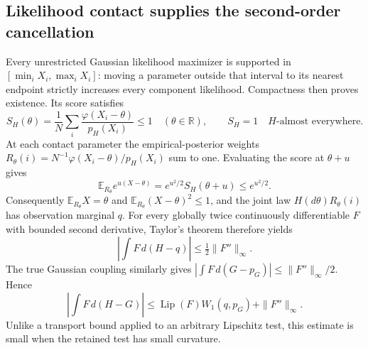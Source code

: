 \documentclass[11pt,a4paper]{article}
\theoremstyle{definition}
\theoremstyle{remark}
\numberwithin{equation}{section}
\begin{document}
\subsection{Likelihood contact supplies the second-order cancellation}

Every unrestricted Gaussian likelihood maximizer is supported in
$[\min_iX_i,\max_iX_i]$: moving a parameter outside that interval
to its nearest endpoint strictly increases every component
likelihood.  Compactness then proves existence.  Its score satisfies
\[
 S_H(\theta)=\frac1N\sum_i
             \frac{\varphi(X_i-\theta)}{p_H(X_i)}\le1
                   \quad(\theta\in\mathbb R),
 \qquad S_H=1\quad H\text{-almost everywhere}.
\]
At each contact parameter the empirical-posterior weights
$R_\theta(i)=N^{-1}\varphi(X_i-\theta)/p_H(X_i)$ sum to one.
Evaluating the score at $\theta+u$ gives
\[
 \mathbb E_{R_\theta}e^{u(X-\theta)}
                  =e^{u^2/2}S_H(\theta+u)\le e^{u^2/2}.
\]
Consequently $\mathbb E_{R_\theta}X=\theta$ and
$\mathbb E_{R_\theta}(X-\theta)^2\le1$, and the joint law
$H(d\theta)R_\theta(i)$ has observation marginal $q$.
For every globally twice continuously differentiable $F$ with
bounded second derivative, Taylor's theorem therefore yields
\begin{equation}\label{p5:gg:taylor}
 \left|\int F\,d(H-q)\right|\le\tfrac12\|F''\|_\infty.
\end{equation}
The true Gaussian coupling similarly gives
$|\int F\,d(G-p_G)|\le\|F''\|_\infty/2$.  Hence
\begin{equation}\label{p5:gg:low}
 \left|\int F\,d(H-G)\right|
 \le\operatorname{Lip}(F)W_1(q,p_G)+\|F''\|_\infty.
\end{equation}
Unlike a transport bound applied to an arbitrary Lipschitz test,
this estimate is small when the retained test has small curvature.
\end{document}
